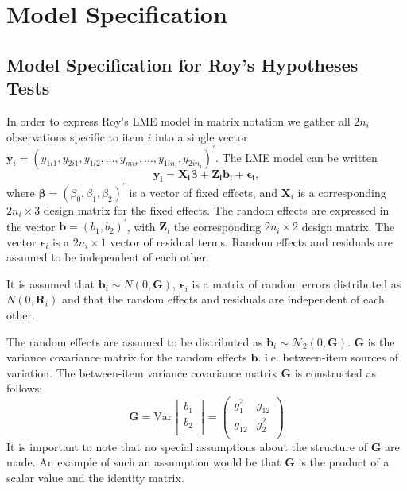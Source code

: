 \documentclass[12pt, a4paper]{report}
\theoremstyle{plain}
\theoremstyle{definition}
\theoremstyle{remark}
\begin{document}
\chapter{Model Specification}

		\section{Model Specification for Roy's Hypotheses Tests}
		
		In order to express Roy's LME model in matrix notation we gather all $2n_i$ observations specific to item $i$ into a single vector  $\boldsymbol{y}_{i} = (y_{1i1},y_{2i1},y_{1i2},\ldots,y_{mir},\ldots,y_{1in_{i}},y_{2in_{i}})^\prime.$ The LME model can be written
		\[
		\boldsymbol{y_{i}} = \boldsymbol{X_{i}\beta} + \boldsymbol{Z_{i}b_{i}} + \boldsymbol{\epsilon_{i}},
		\]
		where $\boldsymbol{\beta}=(\beta_0,\beta_1,\beta_2)^\prime$ is a vector of fixed effects, and $\boldsymbol{X}_i$ is a corresponding $2n_i\times 3$ design matrix for the fixed effects. The random effects are expressed in the vector $\boldsymbol{b}=(b_1,b_2)^\prime$, with $\boldsymbol{Z}_i$ the corresponding $2n_i\times 2$ design matrix. The vector $\boldsymbol{\epsilon}_i$ is a $2n_i\times 1$ vector of residual terms. Random effects and residuals are assumed to be independent of each other.
		
		It is assumed that $\boldsymbol{b}_i \sim N(0,\boldsymbol{G})$, $\boldsymbol{\epsilon}_i$ is a matrix of random errors distributed as $N(0,\boldsymbol{R}_i)$ and that the random effects and residuals are 
		independent of each other.
		
		The random effects are assumed to be distributed as $\boldsymbol{b}_i \sim \mathcal{N}_2(0,\boldsymbol{G})$. 	$\boldsymbol{G}$ is the variance covariance matrix for the random effects $\boldsymbol{b}$.
		i.e. between-item sources of variation. The between-item variance covariance matrix $\boldsymbol{G}$ is constructed as follows:
		\[ \boldsymbol{G} = \mbox{Var}  \left[
		\begin{array}{c}
		b_1   \\
		b_2  \\
		\end{array}
		\right] =  \left(
		\begin{array}{cc}
		g^2_1  & g_{12} \\
		g_{12} & g^2_2 \\
		\end{array}
		\right) \]
		It is important to note that no special assumptions about the structure of $\boldsymbol{G}$ are made. An example of such an assumption would be that $\boldsymbol{G}$ is the product of a scalar value and the identity matrix.
		
\end{document}
